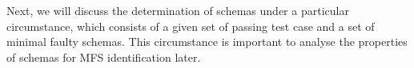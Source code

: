 Next, we will discuss the determination of schemas under a particular circumstance, which consists of a given set of passing test case and a set of minimal faulty schemas. This circumstance is important to analyse the properties of schemas for MFS identification later.

%
%
%
%
%
%
%
%
%
